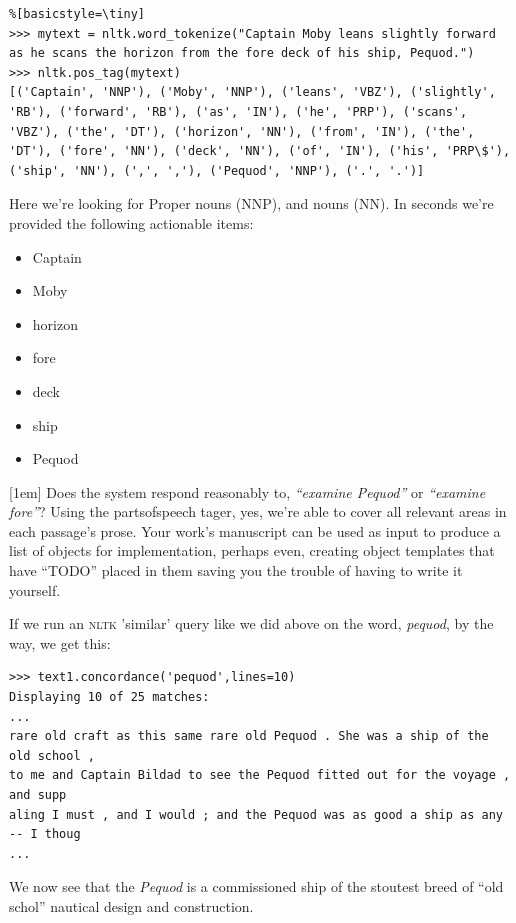 \begin{lstlisting}%[basicstyle=\tiny]
>>> mytext = nltk.word_tokenize("Captain Moby leans slightly forward as he scans the horizon from the fore deck of his ship, Pequod.")
>>> nltk.pos_tag(mytext)
[('Captain', 'NNP'), ('Moby', 'NNP'), ('leans', 'VBZ'), ('slightly', 'RB'), ('forward', 'RB'), ('as', 'IN'), ('he', 'PRP'), ('scans', 'VBZ'), ('the', 'DT'), ('horizon', 'NN'), ('from', 'IN'), ('the', 'DT'), ('fore', 'NN'), ('deck', 'NN'), ('of', 'IN'), ('his', 'PRP\$'), ('ship', 'NN'), (',', ','), ('Pequod', 'NNP'), ('.', '.')]
\end{lstlisting}
Here we're looking for Proper nouns (NNP), and nouns (NN). In seconds we're
provided the following actionable items:
\begin{multicols}{2}
\begin{itemize}\setlength\itemsep{0em}
  \item Captain
  \item Moby
  \item horizon
  \item fore
  \item deck
  \item ship
  \item Pequod
\end{itemize}
\end{multicols}
[1em]
\noindent Does the system respond reasonably to, \emph{``examine Pequod''} or
\emph{``examine fore''}? Using the parts\textendash of\textendash speech tager,
yes, we're able to cover all relevant areas in each passage's prose. Your work's
manuscript can be used as input to produce a list of objects for implementation,
perhaps even, creating object templates that have ``TODO'' placed in them saving you the trouble of having to
write it yourself.

If we run an \textsc{nltk} 'similar' query like we did above on the word,
\emph{pequod}, by the way, we get this:
\pagebreak
\begin{lstlisting}
>>> text1.concordance('pequod',lines=10)
Displaying 10 of 25 matches:
...
rare old craft as this same rare old Pequod . She was a ship of the old school ,
to me and Captain Bildad to see the Pequod fitted out for the voyage , and supp
aling I must , and I would ; and the Pequod was as good a ship as any -- I thoug
...
\end{lstlisting}
We now see that the \emph{Pequod} is a commissioned ship of the stoutest breed
of ``old schol'' nautical design and construction.

